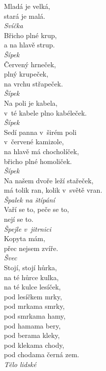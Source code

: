 \begin{multicols}{\value{columnsthindata}}
\noindent
Mladá je velká,\\
stará je malá.\\[1 mm]
{\sl Svíčka}\\

\noindent
Břicho plné krup,\\
a na hlavě strup.\\[1 mm]
{\sl Šípek}\\

\noindent
Červený hrneček,\\
plný krupeček,\\
na vrchu střapeček.\\[1 mm]
{\sl Šípek}\\

\noindent
Na poli je kabela,\\
v~té kabele plno kabéleček.\\[1 mm]
{\sl Šípek}\\

\noindent
Sedí panna v~širém poli\\
v~červené kamizole,\\
na hlavě má chocholíček,\\
břicho plné homoliček.\\[1 mm]
{\sl Šípek}\\

\noindent
Na našem dvoře leží stařeček,\\
má tolik ran, kolik v~světě vran.\\[1 mm]
{\sl Špalek na štípání}\\

\noindent
Vaří se to, peče se to,\\
nejí se to.\\[1 mm]
{\sl Špejle v~jitrnici}\\

\noindent
Kopyta mám,\\
přec nejsem zvíře.\\[1 mm]
{\sl Švec}\\

\noindent
Stojí, stojí hůrka,\\
na té hůrce kulka,\\
na té kulce lesíček,\\
pod lesíčkem mrky,\\
pod mrkama smrky,\\
pod smrkama hamy,\\
pod hamama bery,\\
pod berama kleky,\\
pod klekama chody,\\
pod chodama černá zem.\\[1 mm]
{\sl Tělo lidské}\\


\end{multicols}
